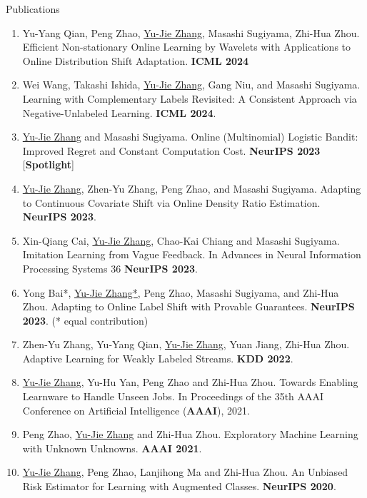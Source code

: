 \documentclass{resume} %
\begin{document}
\begin{rSection}{Publications}
\begin{enumerate}[leftmargin=0.2in, itemsep=-3pt]
	\item Yu-Yang Qian, Peng Zhao, \underline{Yu-Jie Zhang}, Masashi Sugiyama, Zhi-Hua Zhou. Efficient Non-stationary Online Learning by Wavelets with Applications to Online Distribution Shift Adaptation. \textbf{ICML 2024}
	
	\item Wei Wang, Takashi Ishida, \underline{Yu-Jie Zhang}, Gang Niu, and Masashi Sugiyama. Learning with Complementary Labels Revisited: A Consistent Approach via Negative-Unlabeled Learning. \textbf{ICML 2024}.
	 	 
	\item \underline{Yu-Jie Zhang} and Masashi Sugiyama. Online (Multinomial) Logistic Bandit: Improved Regret and Constant Computation Cost. \textbf{NeurIPS 2023} {\color{darkred}[\textbf{Spotlight}]}
	\item \underline{Yu-Jie Zhang}, Zhen-Yu Zhang, Peng Zhao, and Masashi Sugiyama. Adapting to Continuous Covariate Shift via Online Density Ratio Estimation. \textbf{NeurIPS 2023}.
	
	\item Xin-Qiang Cai, \underline{Yu-Jie Zhang}, Chao-Kai Chiang and Masashi Sugiyama. Imitation Learning from Vague Feedback. In {Advances in Neural Information Processing Systems 36} \textbf{NeurIPS 2023}.
	
	\item Yong Bai*, \underline{Yu-Jie Zhang*}, Peng Zhao, Masashi Sugiyama, and Zhi-Hua Zhou. Adapting to Online Label Shift with Provable Guarantees. \textbf{NeurIPS 2023}.  (* equal contribution)
	
	\item Zhen-Yu Zhang, Yu-Yang Qian, \underline{Yu-Jie Zhang}, Yuan Jiang, Zhi-Hua Zhou. Adaptive Learning for Weakly Labeled Streams. \textbf{KDD 2022}.
	
	\item \underline{Yu-Jie Zhang}, Yu-Hu Yan, Peng Zhao and Zhi-Hua Zhou. Towards Enabling Learnware to Handle Unseen Jobs. In {Proceedings of the 35th AAAI Conference on Artificial Intelligence} (\textbf{AAAI}), 2021.
	\item Peng Zhao, \underline{Yu-Jie Zhang} and Zhi-Hua Zhou. Exploratory Machine Learning with Unknown Unknowns. \textbf{AAAI 2021}.
	
	\item \underline{Yu-Jie Zhang}, Peng Zhao, Lanjihong Ma and Zhi-Hua Zhou. An Unbiased Risk Estimator for Learning with Augmented Classes. \textbf{NeurIPS 2020}.
	

\end{enumerate}
\end{rSection}
\end{document}
